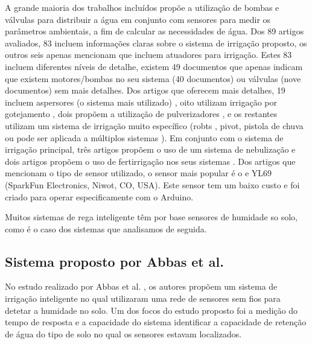 \documentclass[conference]{IEEEtran}
\begin{document}
A grande maioria dos trabalhos incluídos propõe a utilização de
bombas e válvulas para distribuir a água em conjunto com sensores para medir os
parâmetros ambientais, a fim de calcular as necessidades de água. Dos 89
artigos avaliados, 83 incluem informações claras sobre o
sistema de irrigação proposto, os outros seis apenas mencionam que incluem
atuadores para irrigação. Estes 83 incluem diferentes níveis
de detalhe, existem 49 documentos que apenas indicam que existem motores/bombas
no seu sistema (40 documentos) ou válvulas (nove documentos) sem mais detalhes.
Dos artigos que oferecem mais detalhes, 19 incluem aspersores (o sistema
mais utilizado) \cite{gonzalez2018iot, ahmed2016intelligation, yusuf2005information, cambra2017iot, arvind2017automated, ammour2018factory, singh2019iot, wu2016secure, solanki2017conceptual, wasson2017integration, johar2018iot, ryu2015design, reche2014smart, chieochan2017internet, arumugam2018internet, boonchieng2018smart, rawal2017iot, guo2015design, khattab2016design},
oito utilizam irrigação por gotejamento \cite{daskalakis2018uw, nawandar2019iot, barkunan2019smart, sivaprasath2016arduino, kumar2017internet, kodali2016iot, abidin2015web, banumathi2017android}, dois propõem a
utilização de pulverizadores \cite{mechsy2017mobile}, e os restantes utilizam
um sistema de irrigação muito específico (robts \cite{rahul2018iot}, pivot,
pistola de chuva \cite{vasu2017intelligent} ou pode ser aplicada a múltiplos
sistemas \cite{agale2017automated}). Em conjunto com o sistema de irrigação principal,
três artigos propõem o uso de um sistema de nebulização \cite{chieochan2017internet, boonchieng2018smart, kodali2016iot} e dois artigos
propõem o uso de fertirrigação nos seus sistemas \cite{arumugam2018internet, abidin2015web}.
Dos artigos que mencionam o tipo de sensor utilizado, o sensor mais popular é o
e YL69 (SparkFun Electronics, Niwot, CO, USA). Este sensor tem um baixo custo e
foi criado para operar especificamente com o Arduino. \cite{garcia2020iot}

Muitos sistemas de rega inteligente têm por base sensores de humidade so solo, como
é o caso dos sistemas que analisamos de seguida.

\subsection{Sistema proposto por Abbas et al.}

No estudo realizado por Abbas et al. \cite{abbas2014smart}, os autores propõem
um sistema de irrigação inteligente no qual utilizaram uma rede de sensores sem
fios para detetar a humidade no solo. Um dos focos do estudo proposto foi a medição
do tempo de resposta e a capacidade do sistema identificar a capacidade de
retenção de água do tipo de solo no qual os sensores estavam localizados.
\end{document}

